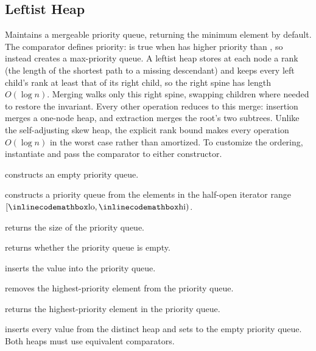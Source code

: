 \subsection{Leftist Heap}
\label{sec:2.3.2}
Maintains a mergeable priority queue, returning the minimum element by default. The comparator  defines priority:  is true when  has higher priority than , so  instead creates a max-priority queue. A leftist heap stores at each node a rank (the length of the shortest path to a missing descendant) and keeps every left child's rank at least that of its right child, so the right spine has length $O(\log n)$. Merging walks only this right spine, swapping children where needed to restore the invariant. Every other operation reduces to this merge: insertion merges a one-node heap, and extraction merges the root's two subtrees. Unlike the self-adjusting skew heap, the explicit rank bound makes every operation $O(\log n)$ in the worst case rather than amortized. To customize the ordering, instantiate  and pass the comparator to either constructor.

\begin{compactitem}
  \item {} constructs an empty priority queue.
  \item {} constructs a priority queue from the elements in the half-open iterator range $[{\inlinecodemath{lo}}, {\inlinecodemath{hi}})$.
  \item {} returns the size of the priority queue.
  \item {} returns whether the priority queue is empty.
  \item {} inserts the value  into the priority queue.
  \item {} removes the highest-priority element from the priority queue.
  \item {} returns the highest-priority element in the priority queue.
  \item {} inserts every value from the distinct heap  and sets  to the empty priority queue. Both heaps must use equivalent comparators.
\end{compactitem}

